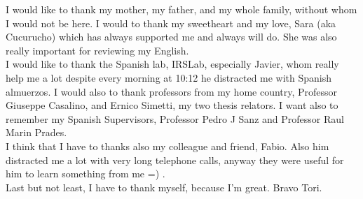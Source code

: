 

\begin{acknowledgements}

I would like to thank my mother, my father, and my whole family, without whom I would not be here. I would to thank my sweetheart and my love, Sara (aka Cucurucho) which has always supported me and always will do. She was also really important for reviewing my English.\\
I would like to thank the Spanish lab, IRSLab, especially Javier, whom really help me a lot despite every morning at 10:12 he distracted me with Spanish almuerzos. I would also to thank professors from my home country, Professor Giuseppe Casalino, and Ernico Simetti, my two thesis relators. I want also to remember my Spanish Supervisors, Professor Pedro J Sanz and Professor Raul Marin Prades.\\
I think that I have to thanks also my colleague and friend, Fabio. Also him distracted me a lot with very long telephone calls, anyway they were useful for him to learn something from me =) .\\
Last but not least, I have to thank myself, because I'm great. Bravo Tori.


\end{acknowledgements}
